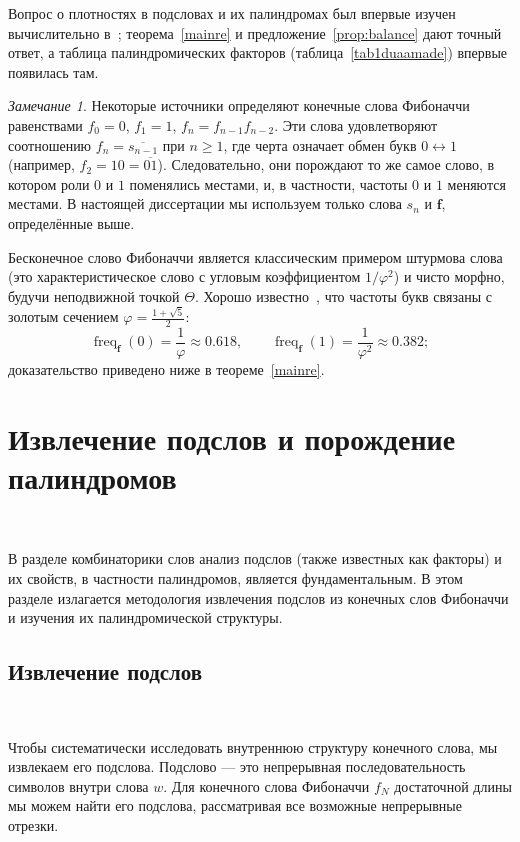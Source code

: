 \documentclass[a4paper,14pt]{extreport}
\theoremstyle{plain}
\theoremstyle{definition}
\theoremstyle{remark}
\newtheorem{remark}{Замечание}
\begin{document}
Вопрос о плотностях в подсловах и их палиндромах был впервые изучен вычислительно в~\cite{Abdullah}; теорема~\ref{mainre} и предложение~\ref{prop:balance} дают точный ответ, а таблица палиндромических факторов (таблица~\ref{tab1duaamade}) впервые появилась там.

\begin{remark}
	Некоторые источники определяют конечные слова Фибоначчи равенствами $f_0=0$, $f_1=1$, $f_n=f_{n-1}f_{n-2}$.
	Эти слова удовлетворяют соотношению $f_n=\overline{s_{n-1}}$ при $n\ge1$, где черта означает обмен букв
	$0\leftrightarrow1$ (например, $f_2=10=\overline{01}$). Следовательно, они порождают то же самое слово, в котором
	роли $0$ и $1$ поменялись местами, и, в частности, частоты $0$ и $1$
	меняются местами. В настоящей диссертации мы используем только слова $s_n$ и $\mathbf f$, определённые выше.
\end{remark}

Бесконечное слово Фибоначчи является классическим примером штурмова слова (это характеристическое
слово с угловым коэффициентом $1/\varphi^{2}$) и чисто морфно, будучи неподвижной точкой $\Theta$.
Хорошо известно~\cite{Berstel}, что частоты букв связаны с золотым
сечением $\varphi=\frac{1+\sqrt5}{2}$:
\begin{equation}
	\operatorname{freq}_{\mathbf f}(0)=\frac1\varphi\approx0.618,\qquad
	\operatorname{freq}_{\mathbf f}(1)=\frac1{\varphi^{2}}\approx0.382 ;
\end{equation}
доказательство приведено ниже в теореме~\ref{mainre}.
\section{Извлечение подслов и порождение палиндромов}~\label{sec3.3}

В разделе комбинаторики слов анализ подслов (также известных как факторы) и их свойств, в частности палиндромов, является фундаментальным. В этом разделе излагается методология извлечения подслов из конечных слов Фибоначчи и изучения их палиндромической структуры.
\subsection{Извлечение подслов}~\label{sec3.3.1}

Чтобы систематически исследовать внутреннюю структуру конечного слова, мы извлекаем его подслова. Подслово --- это непрерывная последовательность символов внутри слова $w$. Для конечного слова Фибоначчи $f_N$ достаточной длины мы можем найти его подслова, рассматривая все возможные непрерывные отрезки.
\end{document}
